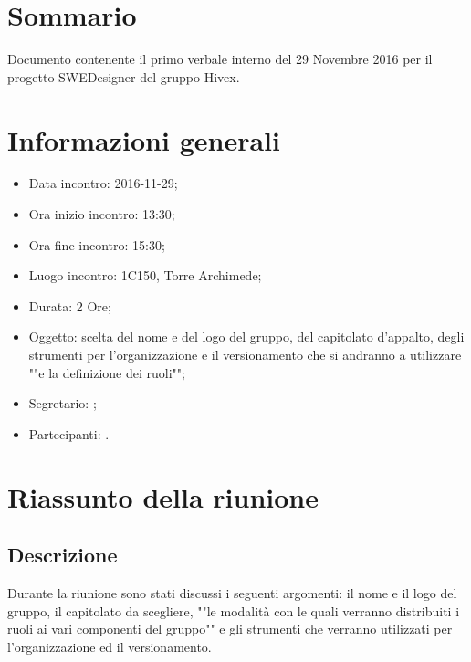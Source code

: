 


\section{Sommario}

  Documento contenente il primo verbale interno del 29 Novembre 2016 per il progetto SWEDesigner del gruppo Hivex.

\section{Informazioni generali}
\begin{itemize}
\item {Data incontro:} 2016-11-29;
\item {Ora inizio incontro:} 13:30;
\item {Ora fine incontro:} 15:30;
\item {Luogo incontro:} 1C150, Torre Archimede; 
\item {Durata:} 2 Ore;
\item {Oggetto:} scelta del nome e del logo del gruppo, del capitolato d’appalto, degli strumenti per l’organizzazione e il versionamento che si andranno a utilizzare ""e la definizione dei ruoli"";
\item {Segretario:} 	\LB; 
\item {Partecipanti:} \GR.
\end{itemize}

\section{Riassunto della riunione}
\subsection{Descrizione} 
Durante la riunione sono stati discussi i seguenti argomenti: il nome e il logo del gruppo, il capitolato da scegliere, ""le modalità con le quali verranno distribuiti i ruoli ai vari componenti del gruppo"" e gli strumenti che verranno utilizzati per l’organizzazione ed il versionamento.
